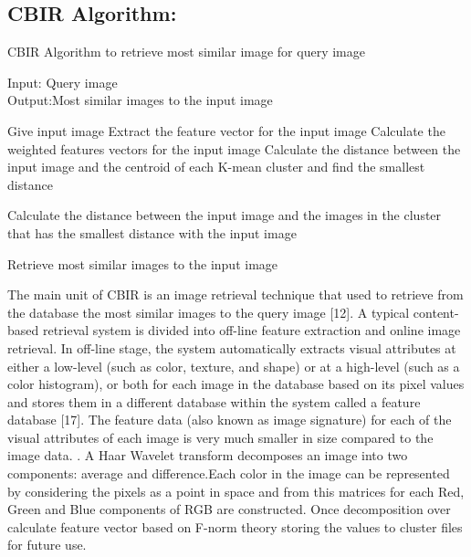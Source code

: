 \subsection[CBIR Algorithm:]{CBIR Algorithm:}
\begin{algorithm}
\caption{CBIR Algorithm to  retrieve most similar image for query image}
   Input: Query image\\
   Output:Most similar images to  the input image\\
\begin{algorithmic}[1]
\State Give input image
\State Extract the feature vector for the input image 
\State Calculate the weighted features vectors for the input image
\State Calculate the distance between the input image and the centroid            of each K-mean  cluster  and find  the smallest distance

\State Calculate the distance between the input image and the images
            in the cluster that has the smallest distance with
             the    input image

\State Retrieve   most similar images to the input image

\end{algorithmic}
\end{algorithm}
\clearpage
\noindent
The main unit of CBIR is an image retrieval technique that used to retrieve from the database the most similar images to the query image [12]. A typical content-based retrieval system is divided into off-line feature extraction and online image retrieval. In off-line stage, the system automatically extracts visual attributes at either a low-level (such as color, texture, and shape) or at a high-level (such as a color histogram), or both for each image in the database based on its pixel values and stores them in a different database within the system called a feature database [17]. The feature data (also known as image signature) for each of the visual attributes of each image is very much smaller in size compared to the image data. . A Haar Wavelet transform decomposes an image into two components: average and difference.Each color in the image can be represented by considering the pixels as a point in space and from this matrices for each Red, Green and Blue components of RGB are constructed. Once decomposition over  calculate feature vector  based on F-norm theory storing the values to cluster files for future use.
